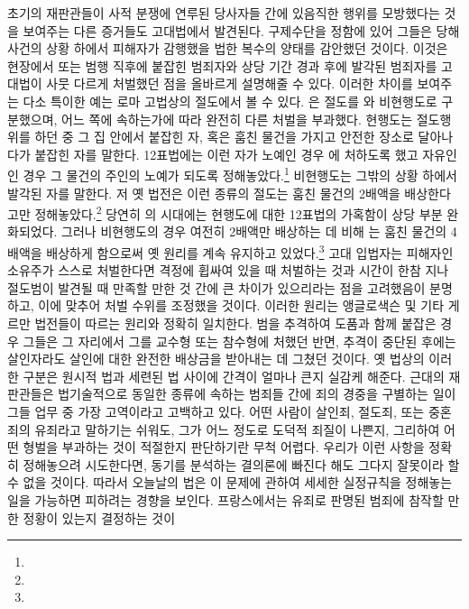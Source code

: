 초기의 재판관들이 사적 분쟁에 연루된 당사자들 간에 있음직한 행위를
모방했다는 것을 보여주는 다른 증거들도 고대법에서 발견된다.
구제수단을 정함에 있어
그들은 당해 사건의 상황 하에서 피해자가 감행했을 법한 복수의 양태를
감안했던 것이다.
이것은 현장에서 또는 범행 직후에 붙잡힌 범죄자와
상당 기간 경과 후에 발각된 범죄자를
고대법이
사뭇 다르게 처벌했던 점을 올바르게 설명해줄 수 있다.
이러한 차이를 보여주는 다소 특이한 예는 로마 고법상의 절도에서 볼 수 있다.
은 절도를
와
비현행도로
구분했으며,
어느 쪽에 속하는가에 따라 완전히 다른 처벌을 부과했다.
현행도는 절도행위를 하던 중 그 집 안에서 붙잡힌 자,
혹은 훔친 물건을 가지고 안전한 장소로 달아나다가 붙잡힌 자를 말한다.
12표법에는 이런 자가 노예인 경우 에 처하도록 했고
자유인인 경우 그 물건의 주인의 노예가 되도록 정해놓았다.\footnote{%
  }
비현행도는 그밖의 상황 하에서 발각된 자를 말한다.
저 옛 법전은 이런 종류의 절도는 훔친 물건의 2배액을 배상한다고만
정해놓았다.\footnote{%
  }
당연히
의 시대에는
현행도에 대한 12표법의 가혹함이 상당 부분 완화되었다.
그러나
비현행도의 경우 여전히 2배액만 배상하는 데 비해
는 훔친 물건의 4배액을 배상하게 함으로써
옛 원리를 계속 유지하고 있었다.\footnote{%
  }
고대 입법자는
피해자인 소유주가
스스로 처벌한다면
격정에 휩싸여 있을 때 처벌하는 것과
시간이 한참 지나 절도범이 발견될 때 만족할 만한 것 간에
큰 차이가 있으리라는 점을 고려했음이 분명하고,
이에 맞추어 처벌 수위를 조정했을 것이다.
이러한 원리는 앵글로색슨 및 기타 게르만 법전들이 따르는 원리와
정확히 일치한다.
범을 추격하여 도품과 함께 붙잡은 경우 그들은
그 자리에서 그를 교수형 또는 참수형에 처했던 반면,
추격이 중단된 후에는 살인자라도 살인에 대한 완전한 배상금을 받아내는 데
그쳤던 것이다.
옛 법상의 이러한 구분은 원시적 법과 세련된 법 사이에
간격이 얼마나 큰지 실감케 해준다.
근대의 재판관들은
법기술적으로 동일한 종류에 속하는 범죄들 간에
죄의 경중을 구별하는 일이
그들 업무 중 가장 고역이라고 고백하고 있다.
어떤 사람이 살인죄, 절도죄, 또는 중혼죄의 유죄라고
말하기는 쉬워도, 그가 어느 정도로 도덕적 죄질이 나쁜지,
그리하여
어떤 형벌을 부과하는 것이 적절한지
판단하기란 무척 어렵다.
우리가 이런 사항을 정확히 정해놓으려 시도한다면,
동기를 분석하는 결의론에 빠진다 해도
그다지 잘못이라 할 수 없을 것이다.
따라서 오늘날의 법은
이 문제에 관하여 세세한 실정규칙을 정해놓는 일을
가능하면 피하려는 경향을 보인다.
프랑스에서는
유죄로 판명된 범죄에 참작할 만한 정황이 있는지 결정하는 것이
